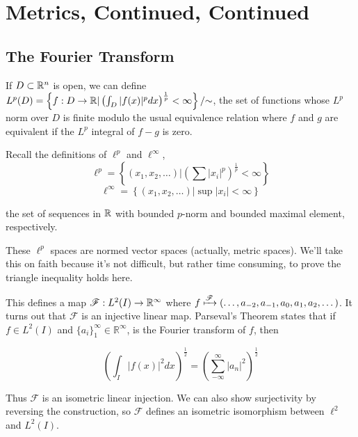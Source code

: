 
\section*{Metrics, Continued, Continued}
\subsection*{The Fourier Transform}

If $D\subset \mathbb{R}^n$ is open, we can define $L^p(D)=\left\{  f:D\rightarrow\mathbb{R} |\left( \int_D |f(x)|^p dx\right)^\frac{1}{p}  < \infty   \right\}/{\sim}$, the set of functions whose $L^p$ norm over $D$ is finite modulo the usual equivalence relation where $f$ and $g$ are equivalent if the $L^p$ integral of $f-g$ is zero.

Recall the definitions of $\ell^p$ and $\ell^\infty$,
$$\ell^p = \left\{ (x_1,x_2,\dots) | \left(\sum|x_i|^p\right)^\frac{1}{p} < \infty \right\}$$
$$\ell^\infty = \left\{ (x_1,x_2,\dots) | \sup|x_i| < \infty \right\}$$

the set of sequences in $\mathbb{R}$ with bounded $p$-norm and bounded maximal element, respectively.

These $\ell^p$ spaces are normed vector spaces (actually, metric spaces).  We'll take this on faith because it's not difficult, but rather time consuming, to prove the triangle inequality holds here.

This defines a map $\mathscr{F}:L^2(I)\rightarrow \mathbb{R}^\infty$ where $f\xmapsto[]{\mathscr{F}}(\dots ,a_{-2},a_{-1},a_0,a_1,a_2,\dots)$.  It turns out that $\mathscr{F}$ is an injective linear map.  Parseval's Theorem states that if $f\in L^2(I)$ and $\{a_i\}_1^\infty \in \mathbb{R}^\infty$, is the Fourier transform of $f$, then 

$$\left(\int_I |f(x)|^2 dx \right)^\frac{1}{2} = \left(\sum\limits_{-\infty}^\infty |a_n|^2\right)^\frac{1}{2}$$

Thus $\mathscr{F}$ is an isometric linear injection.  We can also show surjectivity by reversing the construction, so $\mathscr{F}$ defines an isometric isomorphism between $\ell^2$ and $L^2(I)$.

